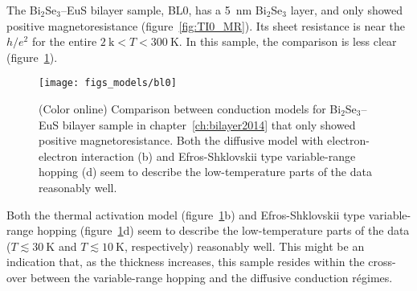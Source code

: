 The Bi$_2$Se$_3$--EuS bilayer sample, BL0, has a \SI{5}{nm} Bi$_2$Se$_3$ layer, and only showed positive magnetoresistance (figure~\ref{fig:TI0_MR}). Its sheet resistance is near the $h/e^2$ for the entire $2~\mathrm{k} < T < 300~\mathrm{K}$. In this sample, the comparison is less clear (figure~\ref{fig:models_bl0}).%
\begin{figure}[ht]%
    \centering%
    \texttt{[image: figs\_models/bl0]}%
    \caption[Conduction model comparison: Bi$_2$Se$_3$--EuS bilayer: BL0]{\label{fig:models_bl0}(Color online) Comparison between conduction models for Bi$_2$Se$_3$--EuS bilayer sample in chapter~\ref{ch:bilayer2014} that only showed positive magnetoresistance. Both the diffusive model with electron-electron interaction (b) and Efros-Shklovskii type variable-range hopping (d) seem to describe the low-temperature parts of the data reasonably well.}%
\end{figure} %
%
Both the thermal activation model (figure~\ref{fig:models_bl0}b) and Efros-Shklovskii type variable-range hopping (figure~\ref{fig:models_bl0}d) seem to describe the low-temperature parts of the data ($T \lesssim 30~\mathrm{K}$ and $T \lesssim 10~\mathrm{K}$, respectively) reasonably well. This might be an indication that, as the thickness increases, this sample resides within the cross-over between the variable-range hopping and the diffusive conduction r\'egimes.

